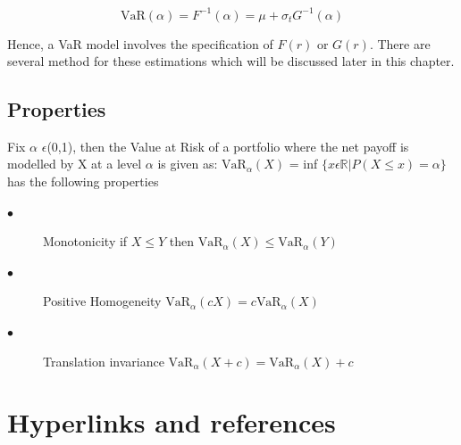 \documentclass[a4paper,11pt,oneside]{book}
\begin{document}
\begin{equation}
\text{VaR} (\alpha) = F^{-1}(\alpha) = \mu + \sigma_tG^{-1}(\alpha)
\label{2}
\end{equation}

Hence, a VaR model involves the specification of $F(r)$ or $G(r)$. There are several method for these estimations which will be discussed later in this chapter.



\section{Properties}

Fix $\alpha$ $\epsilon$(0,1), then the Value at Risk of a portfolio where the net payoff is modelled by X at a level $\alpha$ is given as:\newline
$\text{VaR}_{\alpha}(X)$ = inf $\{x \epsilon \mathbb{R}| P(X \leq x)=\alpha\}$ has the following properties
\newline

\begin{description}

	\item[$\bullet$] Monotonicity \newline if $X \leq Y$ then $\text{VaR}_{\alpha}(X) \leq \text{VaR}_{\alpha}(Y)$
    \item[$\bullet$] Positive Homogeneity
    \newline $\text{VaR}_{\alpha}(cX) = c\text{VaR}_{\alpha}(X)$
    \item[$\bullet$] Translation invariance
     \newline  $\text{VaR}_{\alpha}(X+c) = \text{VaR}_{\alpha}(X)+c$


\end{description}





\chapter{Hyperlinks and references}
\label{href}

\end{document}
